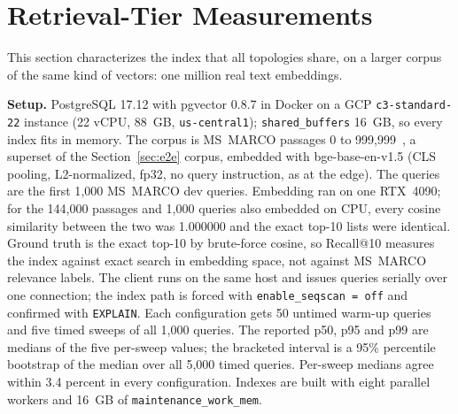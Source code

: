 \documentclass[conference]{IEEEtran}
\newcommand{\code}[1]{\texttt{#1}}
\begin{document}
\section{Retrieval-Tier Measurements}\label{sec:meas}
This section characterizes the index that all topologies share, on a larger corpus of the same
kind of vectors: one million real text embeddings.

\textbf{Setup.} PostgreSQL 17.12 with pgvector 0.8.7 in Docker on a GCP \code{c3-standard-22}
instance (22 vCPU, 88~GB, \code{us-central1}); \code{shared\_buffers} 16~GB, so every index fits in
memory. The corpus is MS~MARCO passages 0 to 999{,}999~\cite{msmarco}, a superset of the
Section~\ref{sec:e2e} corpus, embedded with bge-base-en-v1.5 (CLS pooling, L2-normalized, fp32,
no query instruction, as at the edge). The queries are the first 1{,}000 MS~MARCO dev queries.
Embedding ran on one RTX~4090; for the 144{,}000 passages and 1{,}000 queries also embedded on
CPU, every cosine similarity between the two was 1.000000 and the exact top-10 lists were
identical. Ground truth is the exact top-10 by brute-force cosine, so Recall@10 measures the index
against exact search in embedding space, not against MS~MARCO relevance labels. The client runs on
the same host and issues queries serially over one connection; the index path is forced with
\code{enable\_seqscan = off} and confirmed with \code{EXPLAIN}. Each configuration gets 50 untimed
warm-up queries and five timed sweeps of all 1{,}000 queries. The reported p50, p95 and p99 are
medians of the five per-sweep values; the bracketed interval is a 95\% percentile bootstrap of the
median over all 5{,}000 timed queries. Per-sweep medians agree within 3.4 percent in every
configuration. Indexes are built with eight parallel workers and 16~GB of
\code{maintenance\_work\_mem}.
\end{document}
